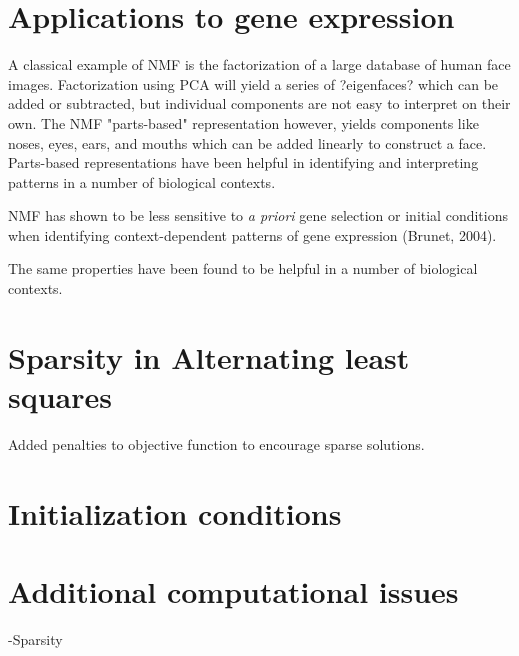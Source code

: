 \documentclass[final,leqno,onefignum,onetabnum]{siamltex1213}
\begin{document}
\section{Applications to gene expression}
A classical example of NMF is the factorization of a large database of human face images. Factorization using PCA will yield a series of ?eigenfaces? which can be added or subtracted, but individual components are not easy to interpret on their own. The NMF "parts-based" representation however, yields components like noses, eyes, ears, and mouths which can be added linearly to construct a face. Parts-based representations have been helpful in identifying and interpreting patterns in a number of biological contexts. 

NMF has shown to be less sensitive to \textit{a priori} gene selection or initial conditions when identifying context-dependent patterns of gene expression (Brunet, 2004). 

The same properties have been found to be helpful in a number of biological contexts. 

\section{Sparsity in Alternating least squares}
Added penalties to objective function to encourage sparse solutions. 


\section{Initialization conditions}

\section{Additional computational issues}
-Sparsity 
\end{document}
